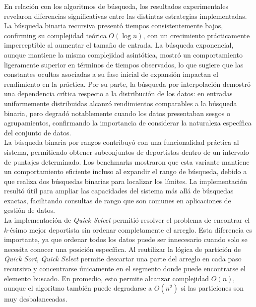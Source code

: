 En relación con los algoritmos de búsqueda, los resultados experimentales revelaron diferencias significativas entre las distintas estrategias implementadas. La búsqueda binaria recursiva presentó tiempos consistentemente bajos, confirming su complejidad teórica $O(\log n)$, con un crecimiento prácticamente imperceptible al aumentar el tamaño de entrada. La búsqueda exponencial, aunque mantiene la misma complejidad asintótica, mostró un comportamiento ligeramente superior en términos de tiempos observados, lo que sugiere que las constantes ocultas asociadas a su fase inicial de expansión impactan el rendimiento en la práctica. Por su parte, la búsqueda por interpolación demostró una dependencia crítica respecto a la distribución de los datos: en entradas uniformemente distribuidas alcanzó rendimientos comparables a la búsqueda binaria, pero degradó notablemente cuando los datos presentaban sesgos o agrupamientos, confirmando la importancia de considerar la naturaleza específica del conjunto de datos. \\

La búsqueda binaria por rangos contribuyó con una funcionalidad práctica al sistema, permitiendo obtener subconjuntos de deportistas dentro de un intervalo de puntajes determinado. Los benchmarks mostraron que esta variante mantiene un comportamiento eficiente incluso al expandir el rango de búsqueda, debido a que realiza dos búsquedas binarias para localizar los límites. La implementación resultó útil para ampliar las capacidades del sistema más allá de búsquedas exactas, facilitando consultas de rango que son comunes en aplicaciones de gestión de datos. \\

La implementación de \textit{Quick Select} permitió resolver el problema de encontrar el $k$-ésimo mejor deportista sin ordenar completamente el arreglo. Esta diferencia es importante, ya que ordenar todos los datos puede ser innecesario cuando solo se necesita conocer una posición específica. Al reutilizar la lógica de partición de \textit{Quick Sort}, \textit{Quick Select} permite descartar una parte del arreglo en cada paso recursivo y concentrarse únicamente en el segmento donde puede encontrarse el elemento buscado. En promedio, esto permite alcanzar complejidad $O(n)$, aunque el algoritmo también puede degradarse a $O(n^2)$ si las particiones son muy desbalanceadas. \\

